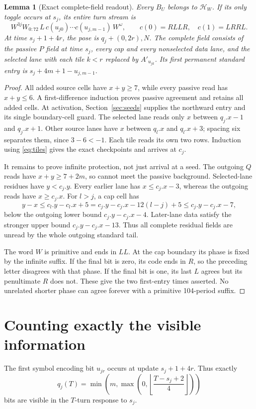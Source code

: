 \documentclass[11pt]{article}
\newtheorem{lemma}[theorem]{Lemma}
\theoremstyle{definition}\newtheorem{definition}[theorem]{Definition}
\newcommand{\HH}{\mathcal H_W}
\begin{document}
\begin{lemma}[Exact complete-field readout]\label{lem:readout}
Every $B_U$ belongs to $\HH$. If its only toggle occurs at $s_j$, its entire
turn stream is
\begin{equation}\label{eq:stream}
W^{3j}W_{0:72}\,L\,c(u_{j0})\cdots c(u_{j,m-1})\,W^\omega,
\qquad c(0)=RLLR,\quad c(1)=LRRL.
\end{equation}
At time $s_j+1+4r$, the pose is $q_j+(0,2r),N$. The complete field consists of
the passive $P$ field at time $s_j$, every cap and every nonselected data lane,
and the selected lane with each tile $k<r$ replaced by $A'_{u_{jk}}$.
Its first permanent standard entry is $s_j+4m+1-u_{j,m-1}$.
\end{lemma}
\begin{proof}
All added source cells have $x+y\ge7$, while every passive read has $x+y\le6$.
A first-difference induction proves passive agreement and retains all added
cells. At activation, Section~\ref{sec:seeds} supplies the northward entry and
its single boundary-cell guard. The selected lane reads only $x$ between
$q_j.x-1$ and $q_j.x+1$. Other source lanes have $x$ between $q_l.x$ and $q_l.x+3$;
spacing six separates them, since $3-6<-1$. Each tile reads its own two rows.
Induction using \eqref{eq:tiles} gives the exact checkpoints and arrives at $c_j$.

It remains to prove infinite protection, not just arrival at a seed. The outgoing
$Q$ reads have $x+y\ge7+2m$, so cannot meet the passive background. Selected-lane
residues have $y<c_j.y$. Every earlier lane has $x\le c_j.x-3$, whereas the
outgoing reads have $x\ge c_j.x$. For $l>j$, a cap cell has
\[
y-x\le c_l.y-c_l.x+5
=c_j.y-c_j.x-12(l-j)+5\le c_j.y-c_j.x-7,
\]
below the outgoing lower bound $c_j.y-c_j.x-4$. Later-lane data satisfy the
stronger upper bound $c_j.y-c_j.x-13$. Thus all complete residual fields are
unread by the whole outgoing standard tail.

The word $W$ is primitive and ends in $LL$. At the cap boundary its phase is
fixed by the infinite suffix. If the final bit is zero, its code ends in $R$,
so the preceding letter disagrees with that phase. If the final bit is one,
its last $L$ agrees but its penultimate $R$ does not. These give the two first-entry
times asserted. No unrelated shorter phase can agree forever with a primitive
104-period suffix.
\end{proof}

\section{Counting exactly the visible information}
The first symbol encoding bit $u_{jr}$ occurs at update $s_j+1+4r$. Thus exactly
\begin{equation}\label{eq:q}
q_j(T)=\min\!\left(m,\max\!\left(0,
\left\lfloor\frac{T-s_j+2}{4}\right\rfloor\right)\right)
\end{equation}
bits are visible in the $T$-turn response to $s_j$.
\end{document}
